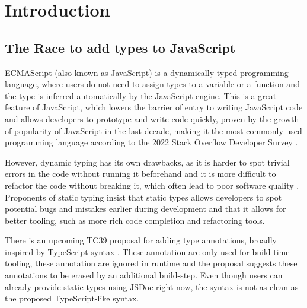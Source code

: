 \chapter*{Introduction}
\setcounter{page}{1}

\section{The Race to add types to JavaScript}

ECMAScript (also known as JavaScript) is a dynamically typed programming language, where users do not need to assign types to a variable or a function and the type is inferred automatically by the JavaScript engine. This is a great feature of JavaScript, which lowers the barrier of entry to writing JavaScript code and allows developers to prototype and write code quickly, proven by the growth of popularity of JavaScript in the last decade, making it the most commonly used programming language according to the 2022 Stack Overflow Developer Survey \cite{StackOverflowDeveloper}.

However, dynamic typing has its own drawbacks, as it is harder to spot trivial errors in the code without running it beforehand and it is more difficult to refactor the code without breaking it, which often lead to poor software quality \cite{fardJSNOSEDetectingJavaScript2013a}. Proponents of static typing insist that static types allows developers to spot potential bugs and mistakes earlier during development and that it allows for better tooling, such as more rich code completion and refactoring tools.

There is an upcoming TC39 proposal for adding type annotations, broadly inspired by TypeScript syntax \cite{ECMAScriptProposalType2023}. These annotation are only used for build-time tooling, these annotation are ignored in runtime and the proposal suggests these annotations to be erased by an additional build-step. Even though users can already provide static types using JSDoc right now, the syntax is not as clean as the proposed TypeScript-like syntax.

